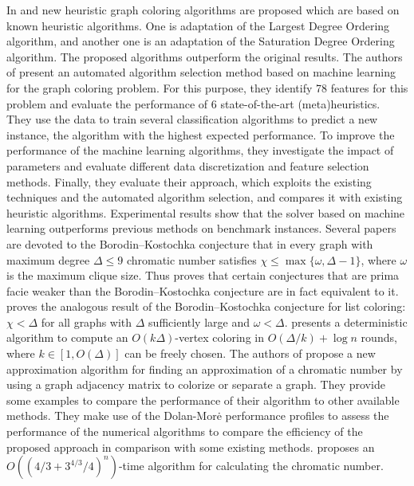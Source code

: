 \documentclass[runningheads]{llncs}
\begin{document}
In \cite{Al-Omari:06} and \cite{Mansuri:10} new heuristic graph coloring algorithms are proposed which are based on known heuristic algorithms. One is adaptation of the Largest Degree Ordering \cite{Avanthay:03} algorithm, and another one is an adaptation of the Saturation Degree Ordering \cite{Falkenauer:96} algorithm. The proposed algorithms outperform the original results. The authors of \cite{Musliu:13} present an automated algorithm selection method based on machine learning for the graph coloring problem. For this purpose, they identify 78 features for this problem and evaluate the performance of 6 state-of-the-art (meta)heuristics. They use the data to train several classification algorithms to predict a new instance, the algorithm with the highest expected performance. To improve the performance of the machine learning algorithms, they investigate the impact of parameters and evaluate different data discretization and feature selection methods. Finally, they evaluate their approach, which exploits the existing techniques and the automated algorithm selection, and compares it with existing heuristic algorithms. Experimental results show that the solver based on machine learning outperforms previous methods on benchmark instances. Several papers are devoted to the Borodin–Kostochka conjecture that in every graph with maximum degree $\Delta\leq 9$ chromatic number satisfies $\chi\leq\max\{\omega,\Delta-1\}$, where $\omega$ is the maximum clique size. Thus \cite{Cranston:15} proves that certain conjectures that are prima facie weaker than the Borodin–Kostochka conjecture are in fact equivalent to it. \cite{Choi:23} proves the analogous result of the Borodin–Kostochka conjecture for list coloring: $\chi<\Delta$ for all graphs with $\Delta$ sufficiently large and $\omega<\Delta$. \cite{Maus:23} presents a deterministic algorithm to compute an $O(k\Delta)$-vertex coloring in $O(\Delta/k)+\log n$ rounds, where $k\in [1,O(\Delta)]$ can be freely chosen. The authors of \cite{Mosawi:24} propose a new approximation algorithm for finding an approximation of a chromatic number by using a graph adjacency matrix to colorize or separate a graph. They provide some examples to compare the performance of their algorithm to other available methods. They make use of the Dolan-Mor\.{e} performance profiles to assess the performance of the numerical algorithms to compare the efficiency of the proposed approach in comparison with some existing methods. \cite{Eppstein:03} proposes an $O((4/3+3^{4/3}/4)^{n})$-time algorithm for calculating the chromatic number.
\end{document}
